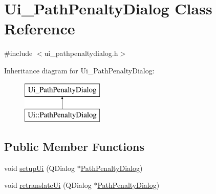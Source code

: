 \hypertarget{class_ui___path_penalty_dialog}{}\section{Ui\+\_\+\+Path\+Penalty\+Dialog Class Reference}
\label{class_ui___path_penalty_dialog}


{\ttfamily \#include $<$ui\+\_\+pathpenaltydialog.\+h$>$}

Inheritance diagram for Ui\+\_\+\+Path\+Penalty\+Dialog\+:\begin{figure}[H]
\begin{center}
\leavevmode
\includegraphics[height=2.000000cm]{d3/da5/class_ui___path_penalty_dialog}
\end{center}
\end{figure}
\subsection*{Public Member Functions}
\begin{DoxyCompactItemize}
\item 
void \mbox{\hyperlink{class_ui___path_penalty_dialog_ad15165a508776206babdb14da68ee9cd}{setup\+Ui}} (Q\+Dialog $\ast$\mbox{\hyperlink{class_path_penalty_dialog}{Path\+Penalty\+Dialog}})
\item 
void \mbox{\hyperlink{class_ui___path_penalty_dialog_a91af871a376c40478863752bff10c15b}{retranslate\+Ui}} (Q\+Dialog $\ast$\mbox{\hyperlink{class_path_penalty_dialog}{Path\+Penalty\+Dialog}})
\end{DoxyCompactItemize}
